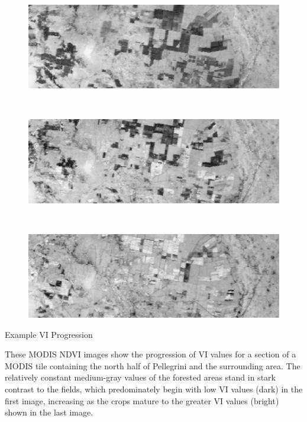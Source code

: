 \begin{ssfigure}
  \centering
  \begin{subfigure}[t]{\textwidth}
    \includegraphics[width=\textwidth]{Graphics/vi_band1.png}
    \caption*{}
    \label{subfig:vi_1}
  \end{subfigure}
  \\
  \vspace{.12in}
  \begin{subfigure}[t]{\textwidth}
    \includegraphics[width=\textwidth]{Graphics/vi_band4.png}
    \caption*{}
    \label{subfig:vi_4}
  \end{subfigure}
  \\
  \vspace{.12in}
  \begin{subfigure}[b]{\textwidth}
    \includegraphics[width=\textwidth]{Graphics/vi_band8.png}
    \caption*{}
    \label{subfig:vi_8}
  \end{subfigure}
  \caption{Example VI Progression}
  \label{fig:tsi}
  \vfill
  \small
  These MODIS NDVI images show the progression of VI values for a section of a MODIS tile containing the north half of Pellegrini and the surrounding area. The relatively constant medium-gray values of the forested areas stand in stark contrast to the fields, which predominately begin with low VI values (dark) in the first image, increasing as the crops mature to the greater VI values (bright) shown in the last image.
\end{ssfigure}
	
